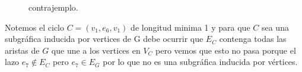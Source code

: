 \begin{enumerate}
\begin{figure}[!hbt]
\begin{center}
              \end{center}
              \caption{contrajemplo.}
          \end{figure}

          Notemos el ciclo $C=(v_1,e_6,v_1)$ de longitud minima 1 y para que $C$ sea una subgráfica inducida por vertices de G debe ocurrir que $E_C$ contenga todas las aristas de $G$ que une a los vertices en $V_C$ pero vemos que esto no pasa porque el lazo $e_7\notin E_C$ pero $e_7\in E_G$ por lo que no es una subgráfica inducida por vértices.
\end{enumerate}